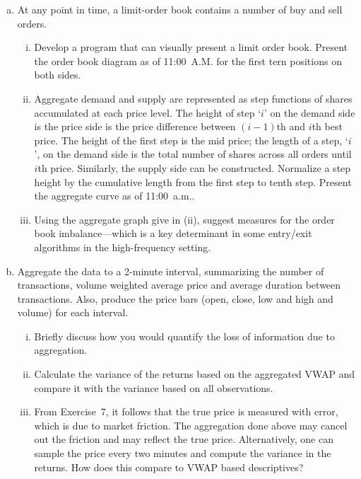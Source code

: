 \begin{enumerate}[(a)]
\item At any point in time, a limit-order book contains a number of buy and sell orders.
	\begin{enumerate}[(i)]
	\item Develop a program that can visually present a limit order book. Present the order book diagram as of 11:00~A.M. for the first tern positions on both sides.
	\item Aggregate demand and supply are represented as step functions of shares accumulated at each price level. The height of step `$i$' on the demand side is the price side is the price difference between $(i-1)$th and $i$th best price. The height of the first step is the mid price; the length of a step, `$i$', on the demand side is the total number of shares across all orders until $i$th price. Similarly, the supply side can be constructed. Normalize a step height by the cumulative length from the first step to tenth step. Present the aggregate curve as of 11:00~a.m.. 
	\item Using the aggregate graph give in (ii), suggest measures for the order book imbalance---which is a key determinant in some entry/exit algorithms in the high-frequency setting.
	\end{enumerate}

\item Aggregate the data to a 2-minute interval, summarizing the number of transactions, volume weighted average price and average duration between transactions. Also, produce the price bars (open, close, low and high and volume) for each interval.
	\begin{enumerate}[(i)]
	\item Briefly discuss how you would quantify the loss of information due to aggregation.
	\item Calculate the variance of the returns based on the aggregated VWAP and compare it with the variance based on all observations.
	\item From Exercise~7, it follows that the true price is measured with error, which is due to market friction. The aggregation done above may cancel out the friction and may reflect the true price. Alternatively, one can sample the price every two minutes and compute the variance in the returns. How does this compare to VWAP based descriptives?
	\end{enumerate}
\end{enumerate}